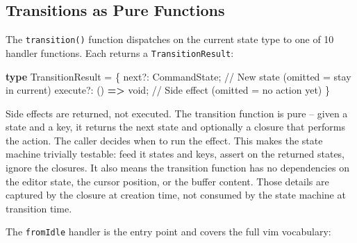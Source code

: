 \documentclass[
  english,
  11pt,
  letterpaper,
]{book}
\newenvironment{Shaded}{\begin{snugshade}}{\end{snugshade}}
\newcommand{\CommentTok}[1]{\textcolor[rgb]{0.37,0.37,0.37}{#1}}
\newcommand{\DataTypeTok}[1]{\textcolor[rgb]{0.68,0.00,0.00}{#1}}
\newcommand{\KeywordTok}[1]{\textcolor[rgb]{0.00,0.23,0.31}{\textbf{#1}}}
\newcommand{\NormalTok}[1]{\textcolor[rgb]{0.00,0.23,0.31}{#1}}
\newcommand{\OperatorTok}[1]{\textcolor[rgb]{0.37,0.37,0.37}{#1}}
\begin{document}
\subsection{Transitions as Pure
Functions}\label{transitions-as-pure-functions}

The \texttt{transition()} function dispatches on the current state type
to one of 10 handler functions. Each returns a
\texttt{TransitionResult}:

\begin{Shaded}
\begin{Highlighting}[]
\KeywordTok{type}\NormalTok{ TransitionResult }\OperatorTok{=}\NormalTok{ \{}
\NormalTok{  next}\OperatorTok{?:}\NormalTok{ CommandState}\OperatorTok{;}    \CommentTok{// New state (omitted = stay in current)}
\NormalTok{  execute}\OperatorTok{?:}\NormalTok{ () }\KeywordTok{=\textgreater{}} \DataTypeTok{void}\OperatorTok{;}   \CommentTok{// Side effect (omitted = no action yet)}
\NormalTok{\}}
\end{Highlighting}
\end{Shaded}

Side effects are returned, not executed. The transition function is pure
-- given a state and a key, it returns the next state and optionally a
closure that performs the action. The caller decides when to run the
effect. This makes the state machine trivially testable: feed it states
and keys, assert on the returned states, ignore the closures. It also
means the transition function has no dependencies on the editor state,
the cursor position, or the buffer content. Those details are captured
by the closure at creation time, not consumed by the state machine at
transition time.

The \texttt{fromIdle} handler is the entry point and covers the full vim
vocabulary:
\end{document}
